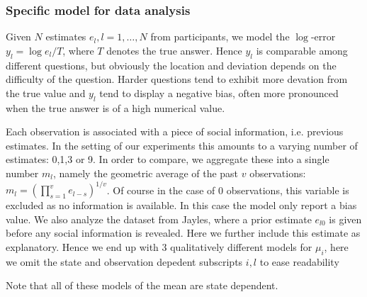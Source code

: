 \documentclass[10pt,a4paper,twocolumn,lineno]{article}
\begin{document}
\subsubsection{Specific model for data analysis}
\noindent
Given $N$ estimates $e_l, l=1,\dots,N$ from participants, we model the $\log$-error $y_l = \log e_l/T$, where $T$ denotes the true answer. Hence $y_l$ is comparable among different questions, but obviously the location and deviation depends on the difficulty of the question. Harder questions tend to exhibit more devation from the true value and $y_l$ tend to display a negative bias, often more pronounced when the true answer is of a high numerical value.

Each observation is associated with a piece of social information, i.e. previous estimates. In the setting of our experiments this amounts to a varying number of estimates: 0,1,3 or 9. In order to compare, we aggregate these into a single number $m_l$, namely the geometric average of the past $v$ observations: $m_l=\left(\prod_{s=1}^v e_{l-s} \right)^{1/v}$. Of course in the case of 0 observations, this variable is excluded as no information is available. In this case the model only report a bias value. We also analyze the dataset from Jayles, where a prior estimate $e_{l0}$ is given before any social information is revealed. Here we further include this estimate as explanatory. Hence we end up with 3 qualitatively different models for $\mu_i$, here we omit the state and observation depedent subscripts $i, l$ to ease readability

Note that all of these models of the mean are state dependent.
\end{document}
